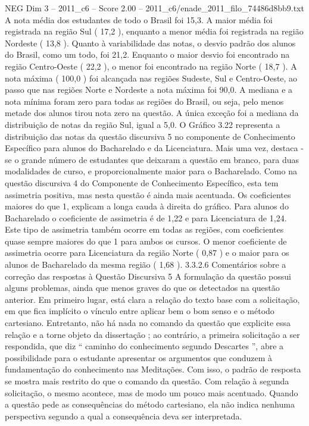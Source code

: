\begin{textsample}{NEG Dim 3 – 2011\_c6 – Score 2.00 – 2011\_c6/enade\_2011\_filo\_74486d8bb9.txt}
A nota média dos estudantes de todo o Brasil foi 15,3.
A maior média foi registrada na região Sul ( 17,2 ), enquanto a menor média foi registrada na região Nordeste ( 13,8 ).
Quanto à variabilidade das notas, o desvio padrão dos alunos do Brasil, como um todo, foi 21,2.
Enquanto o maior desvio foi encontrado na região Centro-Oeste ( 22,2 ), o menor foi encontrado na região Norte ( 18,7 ).
A nota máxima ( 100,0 ) foi alcançada nas regiões Sudeste, Sul e Centro-Oeste, ao passo que nas regiões Norte e Nordeste a nota máxima foi 90,0.
A mediana e a nota mínima foram zero para todas as regiões do Brasil, ou seja, pelo menos metade dos alunos tirou nota zero na questão.
A única exceção foi a mediana da distribuição de notas da região Sul, igual a 5,0.
O Gráfico 3.22 representa a distribuição das notas da questão discursiva 5 no componente de Conhecimento Específico para alunos do Bacharelado e da Licenciatura.
Mais uma vez, destaca -se o grande número de estudantes que deixaram a questão em branco, para duas modalidades de curso, e proporcionalmente maior para o Bacharelado.
Como na questão discursiva 4 do Componente de Conhecimento Específico, esta tem assimetria positiva, mas nesta questão é ainda mais acentuada.
Os coeficientes maiores do que 1, explicam a longa cauda à direita do gráfico.
Para alunos do Bacharelado o coeficiente de assimetria é de 1,22 e para Licenciatura de 1,24.
Este tipo de assimetria também ocorre em todas as regiões, com coeficientes quase sempre maiores do que 1 para ambos os cursos.
O menor coeficiente de assimetria ocorre para Licenciatura da região Norte ( 0,87 ) e o maior para os alunos de Bacharelado da mesma região ( 1,68 ). 3.3.2.6 Comentários sobre a correção das respostas à Questão Discursiva 5 A formulação da questão possui alguns problemas, ainda que menos graves do que os detectados na questão anterior.
Em primeiro lugar, está clara a relação do texto base com a solicitação, em que fica implícito o vínculo entre aplicar bem o bom senso e o método cartesiano.
Entretanto, não há nada no comando da questão que explicite essa relação e a torne objeto da dissertação ; ao contrário, a primeira solicitação a ser respondida, que diz “ caminho do conhecimento segundo Descartes ”, abre a possibilidade para o estudante apresentar os argumentos que conduzem à fundamentação do conhecimento nas Meditações.
Com isso, o padrão de resposta se mostra mais restrito do que o comando da questão.
Com relação à segunda solicitação, o mesmo acontece, mas de modo um pouco mais acentuado.
Quando a questão pede as consequências do método cartesiano, ela não indica nenhuma perspectiva segundo a qual a consequência deva ser interpretada.

\end{textsample}
